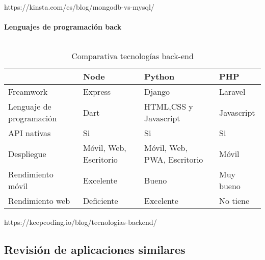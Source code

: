 https://kinsta.com/es/blog/mongodb-vs-mysql/ \\ \\

\textbf{Lenguajes de programación back} \\ \\
\begin{table}[H] %
    \centering
    \begin{tabular}{|p{2cm} |p{4 cm} |p{4cm} |p{4cm} |} \hline 
         &  \textbf{Node}&  \textbf{Python}& \textbf{PHP}\\  \hline 
         Freamwork &  Express &  Django & Laravel\\ \hline 
         
        Lenguaje de programación &  Dart&  HTML,CSS y Javascript & Javascript\\ \hline 
        API nativas &  Si&  Si & Si\\ \hline 
        Despliegue &  Móvil, Web, Escritorio&  Móvil, Web, PWA, Escritorio & Móvil\\ \hline 
        Rendimiento móvil &  Excelente &  Bueno & Muy bueno\\ \hline 
        Rendimiento web &  Deficiente &  Excelente & No tiene\\ \hline 
    \end{tabular}
    \caption{Comparativa tecnologías back-end}
    \label{tab:tec_back}
\end{table}



https://keepcoding.io/blog/tecnologias-backend/


\subsection{Revisión de aplicaciones similares}